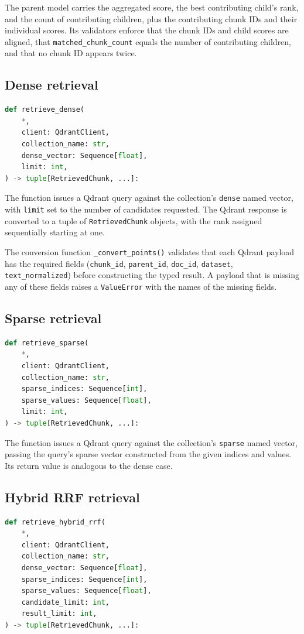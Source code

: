 \documentclass[11pt,a4paper]{article}
\begin{document}
The parent model carries the aggregated score, the best contributing
child's rank, and the count of contributing children, plus the
contributing chunk IDs and their individual scores. Its validators
enforce that the chunk IDs and child scores are aligned, that
\texttt{matched\_chunk\_count} equals the number of contributing
children, and that no chunk ID appears twice.

\subsection{Dense retrieval}
\begin{lstlisting}[language=python]
def retrieve_dense(
    *,
    client: QdrantClient,
    collection_name: str,
    dense_vector: Sequence[float],
    limit: int,
) -> tuple[RetrievedChunk, ...]:
\end{lstlisting}

The function issues a Qdrant query against the collection's
\texttt{dense} named vector, with \texttt{limit} set to the number
of candidates requested. The Qdrant response is converted to a tuple
of \texttt{RetrievedChunk} objects, with the rank assigned
sequentially starting at one.

The conversion function \texttt{\_convert\_points()} validates that
each Qdrant payload has the required fields
(\texttt{chunk\_id}, \texttt{parent\_id}, \texttt{doc\_id},
\texttt{dataset}, \texttt{text\_normalized}) before constructing the
typed result. A payload that is missing any of these fields raises a
\texttt{ValueError} with the names of the missing fields.

\subsection{Sparse retrieval}
\begin{lstlisting}[language=python]
def retrieve_sparse(
    *,
    client: QdrantClient,
    collection_name: str,
    sparse_indices: Sequence[int],
    sparse_values: Sequence[float],
    limit: int,
) -> tuple[RetrievedChunk, ...]:
\end{lstlisting}

The function issues a Qdrant query against the collection's
\texttt{sparse} named vector, passing the query's sparse vector
constructed from the given indices and values. Its return value is
analogous to the dense case.

\subsection{Hybrid RRF retrieval}
\begin{lstlisting}[language=python]
def retrieve_hybrid_rrf(
    *,
    client: QdrantClient,
    collection_name: str,
    dense_vector: Sequence[float],
    sparse_indices: Sequence[int],
    sparse_values: Sequence[float],
    candidate_limit: int,
    result_limit: int,
) -> tuple[RetrievedChunk, ...]:
\end{lstlisting}
\end{document}
